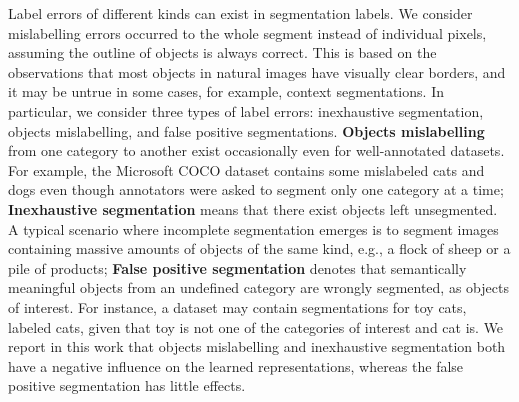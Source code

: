 
Label errors of different kinds can exist in segmentation labels.
We consider mislabelling errors occurred to the whole segment instead of individual pixels, assuming the outline of objects is always correct.
This is based on the observations that most objects in natural images have visually clear borders, and it may be untrue in some cases, for example, context segmentations\cite{mottaghi2014role}.
In particular, we consider three types of label errors: inexhaustive segmentation, objects mislabelling, and false positive segmentations.
\textbf{Objects mislabelling} from one category to another exist occasionally even for well-annotated datasets.
For example, the Microsoft COCO dataset \cite{lin2014microsoft} contains some mislabeled cats and dogs even though annotators were asked to segment only one category at a time;
\textbf{Inexhaustive segmentation} means that there exist objects left unsegmented.
A typical scenario where incomplete segmentation emerges is to segment images containing massive amounts of objects of the same kind, e.g., a flock of sheep or a pile of products;
\textbf{False positive segmentation} denotes that semantically meaningful objects from an undefined category are wrongly segmented, as objects of interest.
For instance, a dataset may contain segmentations for toy cats, labeled cats, given that toy is not one of the categories of interest and cat is.
We report in this work that objects mislabelling and inexhaustive segmentation both have a negative influence on the learned representations, whereas the false positive segmentation has little effects.





